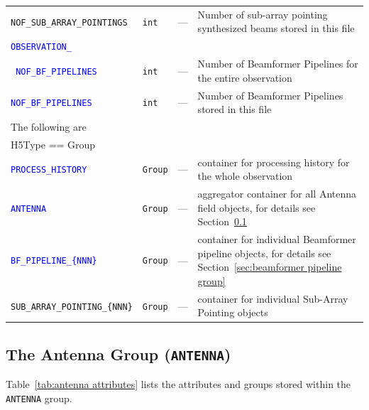 \documentclass[a4paper,10pt,bibtotoc]{scrartcl}
\begin{document}
\begin{supertabular}{|lllp{5.5cm}|}
  \verb|NOF_SUB_ARRAY_POINTINGS|  & \verb|int| & --- & Number of sub-array pointing synthesized beams stored in this file \\
  \textcolor{blue}{\texttt{OBSERVATION\_}}  &  &  &  \\
  \textcolor{blue}{\texttt{ NOF\_BF\_PIPELINES}} & \verb|int| & --- & Number of Beamformer Pipelines for the entire observation \\
  \textcolor{blue}{\texttt{NOF\_BF\_PIPELINES}} & \verb|int| & --- & Number of Beamformer Pipelines stored in this file \\
  \hline
  \sc The following are & \sc & \sc &\\
  \sc H5Type == Group & \sc & \sc &\\
  \hline
  \textcolor{blue}{\texttt{PROCESS\_HISTORY}} & \verb|Group| & --- & container for processing history for the whole observation \\
  \textcolor{blue}{\texttt{ANTENNA}}         & \verb|Group| & --- & aggregator container for all Antenna field objects, for details see Section~\ref{sec:antenna group} \\
  \textcolor{blue}{\texttt{BF\_PIPELINE\_\{NNN\}}} & \verb|Group| & --- & container for individual Beamformer pipeline objects, for details see Section~\ref{sec:beamformer pipeline group} \\
  \verb|SUB_ARRAY_POINTING_{NNN}|  & \verb|Group| & --- & container for individual Sub-Array Pointing objects \\
  \hline
  \end{supertabular}

\clearpage
\subsection{The Antenna Group ({\tt ANTENNA})}
\label{sec:antenna group}

Table~\ref{tab:antenna attributes} lists the attributes and groups stored within the \verb|ANTENNA| group.
\end{document}
